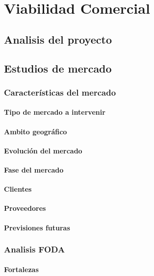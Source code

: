 \chapter{Viabilidad Comercial}

\section{Analisis del proyecto}

\section{Estudios de mercado}
\subsection{Características del mercado}
\subsubsection{Tipo de mercado a intervenir}
\subsubsection{Ambito geográfico}
\subsubsection{Evolución del mercado}
\subsubsection{Fase del mercado}
\subsubsection{Clientes}
\subsubsection{Proveedores}
\subsubsection{Previsiones futuras}

\subsection{Analisis FODA}
\subsubsection{Fortalezas}
